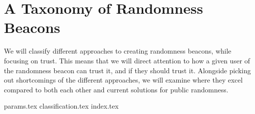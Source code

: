 \section{A Taxonomy of Randomness Beacons}
\label{sec:a_taxonomy_of_randomness_beacons}
We will classify different approaches to creating randomness beacons, while focusing on trust.
This means that we will direct attention to how a given user of the randomness beacon can trust it, and if they should trust it.
Alongside picking out shortcomings of the different approaches, we will examine where they excel compared to both each other and current solutions for public randomness.

{params.tex}
{classification.tex}
{index.tex}
